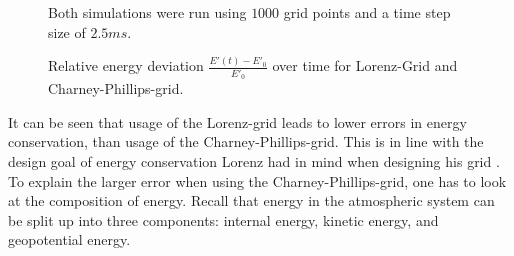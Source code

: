 \begin{figure}[!h]
    \caption{Relative energy deviation $\frac{E'(t)-E'_0}{E'_0}$ over time for Lorenz-Grid and Charney-Phillips-grid.}
    \label{fig:energy_error}
    \small
Both simulations were run using $1000$ grid points and a time step size of $2.5ms$.
\end{figure}

It can be seen that usage of the Lorenz-grid leads to lower errors in energy conservation, than usage of the Charney-Phillips-grid.
This is in line with the design goal of energy conservation Lorenz had in mind when designing his grid \cite{lorenz1960energy}.\\
To explain the larger error when using the Charney-Phillips-grid, one has to look at the composition of energy.
Recall that energy in the atmospheric system can be split up into three components: internal energy, kinetic energy, and geopotential energy.

